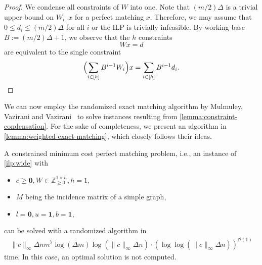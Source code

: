 \documentclass[a4paper,UKenglish,cleveref,thm-restate]{lipics-v2021}
\newcommand{\Z}{\mathbb Z}
\newcommand{\veczero}{\mathbf0}
\newcommand{\vecone}{\mathbf1}
\renewcommand{\O}{\mathcal O}
\begin{document}
\begin{proof}
    We condense all constraints of $W$ into one. Note that $(m/2)\Delta$ is a trivial upper bound on $W_{i,\cdot}x$ for a perfect matching $x$. Therefore, we may assume that $0\le d_i\le(m/2)\Delta$ for all $i$ or the ILP is trivially infeasible. By working base $B:=(m/2)\Delta+1$, we observe that the $h$ constraints
    \[
        Wx=d
    \]
    are equivalent to the single constraint
    \[
        \Bigl(\sum_{i\in[h]}B^{i-1}W_i\Bigr)x=\sum_{i\in[h]}B^{i-1}d_i.
    \]
\end{proof}

We can now employ the randomized exact matching algorithm by Mulmuley, Vazirani and Vazirani~\cite{DBLP:journals/combinatorica/MulmuleyVV87} to solve instances resulting from \cref{lemma:constraint-condensation}. For the sake of completeness, we present an algorithm in \cref{lemma:weighted-exact-matching}, which closely follows their ideas.

\begin{lemma}
    A constrained minimum cost perfect matching problem, i.e., an instance of \cref{ilp:wide} with
    \begin{itemize}
        \item $c\ge\veczero,W\in\Z_{\ge0}^{1\times n},h=1$,
        \item $M$ being the incidence matrix of a simple graph,
        \item $l=\veczero,u=\vecone,b=\vecone$,
    \end{itemize}
    can be solved with a randomized algorithm in 
    \begin{align*}
        \|c\|_\infty\Delta nm^7\log(\Delta m)\log(\|c\|_\infty\Delta n)\cdot(\log\log(\|c\|_\infty\Delta n))^{\O(1)}
    \end{align*}
    time. In this case, an optimal solution is not computed.
    \label{lemma:weighted-exact-matching}
\end{lemma}
\end{document}
